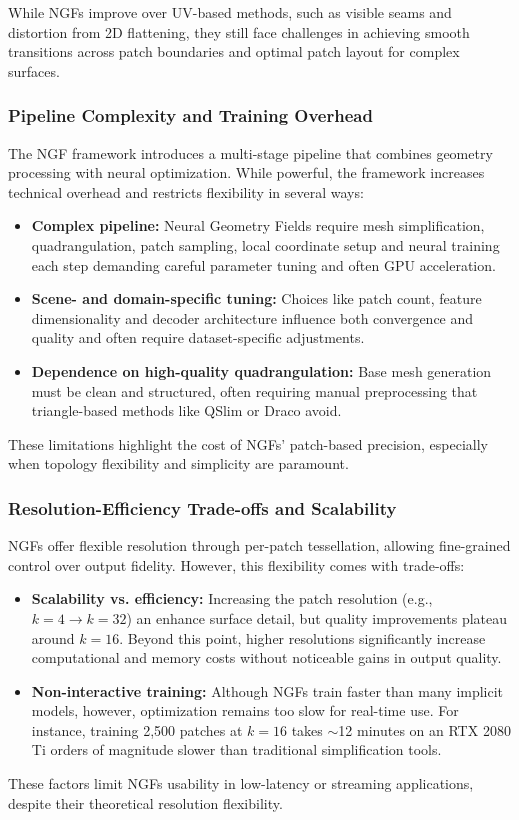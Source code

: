 While NGFs improve over UV-based methods, such as visible seams and distortion from 2D flattening, they still face challenges in achieving smooth transitions across patch boundaries and optimal patch layout for complex surfaces.

\subsubsection{Pipeline Complexity and Training Overhead}

The NGF framework introduces a multi-stage pipeline that combines geometry processing with neural optimization. 
While powerful, the framework increases technical overhead and restricts flexibility in several ways: 

\begin{itemize}
    \item \textbf{Complex pipeline:} Neural Geometry Fields require mesh simplification, quadrangulation, patch sampling, local coordinate setup and neural training each step demanding careful parameter tuning and often GPU acceleration.
    \item \textbf{Scene- and domain-specific tuning:} Choices like patch count, feature dimensionality and decoder architecture influence both convergence and quality and often require dataset-specific adjustments.
    \item \textbf{Dependence on high-quality quadrangulation:} Base mesh generation must be clean and structured, often requiring manual preprocessing that triangle-based methods like QSlim or Draco avoid.
\end{itemize}

These limitations highlight the cost of NGFs' patch-based precision, especially when topology flexibility and simplicity are paramount. 

\subsubsection{Resolution-Efficiency Trade-offs and Scalability}

NGFs offer flexible resolution through per-patch tessellation, allowing fine-grained control over output fidelity. 
However, this flexibility comes with trade-offs: 

\begin{itemize}
    \item \textbf{Scalability vs. efficiency:} Increasing the patch resolution (e.g., $k = 4 \rightarrow k = 32$) an enhance surface detail, but quality improvements plateau around $k = 16$. Beyond this point, higher resolutions significantly increase computational and memory costs without noticeable gains in output quality.
    \item \textbf{Non-interactive training:} Although NGFs train faster than many implicit models, however, optimization remains too slow for real-time use. For instance, training 2,500 patches at $k = 16$ takes $\sim$12 minutes on an RTX 2080 Ti orders of magnitude slower than traditional simplification tools.
\end{itemize}

These factors limit NGFs usability in low-latency or streaming applications, despite their theoretical resolution flexibility. 
